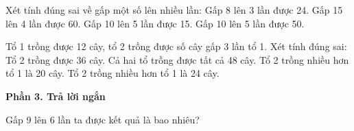 \begin{ex} %
Xét tính đúng sai về gấp một số lên nhiều lần:
\choiceTF
{\True Gấp 8 lên 3 lần được 24.}
{\True Gấp 15 lên 4 lần được 60.}
{Gấp 10 lên 5 lần được 15.}
{\True Gấp 10 lên 5 lần được 50.}
\end{ex}

\begin{ex} %
Tổ 1 trồng được 12 cây, tổ 2 trồng được số cây gấp 3 lần tổ 1. Xét tính đúng sai:
\choiceTF
{\True Tổ 2 trồng được 36 cây.}
{\True Cả hai tổ trồng được tất cả 48 cây.}
{Tổ 2 trồng nhiều hơn tổ 1 là 20 cây.}
{\True Tổ 2 trồng nhiều hơn tổ 1 là 24 cây.}
\end{ex}

\textbf{Phần 3. Trả lời ngắn}

\begin{ex} %
Gấp 9 lên 6 lần ta được kết quả là bao nhiêu?
\end{ex}

